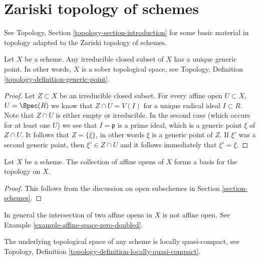 \section{Zariski topology of schemes}
\label{section-topology}

\noindent
See Topology, Section \ref{topology-section-introduction}
for some basic material in topology adapted to the Zariski
topology of schemes.

\begin{lemma}
\label{lemma-scheme-sober}
Let $X$ be a scheme.
Any irreducible closed subset of $X$ has a unique generic point.
In other words, $X$ is a sober topological space, see
Topology, Definition \ref{topology-definition-generic-point}.
\end{lemma}

\begin{proof}
Let $Z \subset X$ be an irreducible closed subset.
For every affine open $U \subset X$, $U = \Spec(R)$
we know that $Z \cap U = V(I)$ for a unique
radical ideal $I \subset R$. Note that $Z \cap U$ is either
empty or irreducible. In the second case (which occurs
for at least one $U$) we see that $I = \mathfrak p$
is a prime ideal, which is a generic point $\xi$ of $Z \cap U$.
It follows that $Z = \overline{\{\xi\}}$, in other words
$\xi$ is a generic point of $Z$. If $\xi'$ was a second
generic point, then $\xi' \in Z \cap U$ and it follows
immediately that $\xi' = \xi$.
\end{proof}

\begin{lemma}
\label{lemma-basis-affine-opens}
Let $X$ be a scheme. The collection of affine opens
of $X$ forms a basis for the topology on $X$.
\end{lemma}

\begin{proof}
This follows from the discussion on open subschemes
in Section \ref{section-schemes}.
\end{proof}

\begin{remark}
\label{remark-intersection-affine-opens}
In general the intersection of two affine opens in $X$
is not affine open. See Example \ref{example-affine-space-zero-doubled}.
\end{remark}

\begin{lemma}
\label{lemma-locally-quasi-compact}
The underlying topological space of any scheme is
locally quasi-compact, see
Topology, Definition \ref{topology-definition-locally-quasi-compact}.
\end{lemma}

